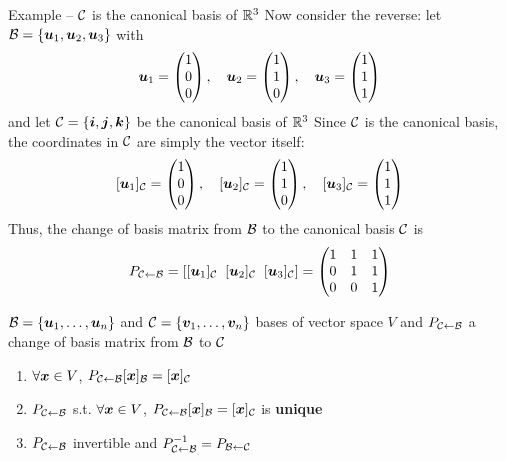 \documentclass[aspectratio=169]{beamer}\usepackage[]{graphicx}\usepackage[]{xcolor}
\begin{document}
\begin{frame}{Example -- $\mathcal{C}$ is the canonical basis of $\mathbb{R}^3$}
Now consider the reverse: let $\mathcal{B}=\{\bm{u}_1,\bm{u}_2,\bm{u}_3\}$ with
\[
\bm{u}_1 = \begin{pmatrix} 1 \\ 0 \\ 0 \end{pmatrix}, \quad
\bm{u}_2 = \begin{pmatrix} 1 \\ 1 \\ 0 \end{pmatrix}, \quad
\bm{u}_3 = \begin{pmatrix} 1 \\ 1 \\ 1 \end{pmatrix}
\]
and let $\mathcal{C}=\{\bm{i},\bm{j},\bm{k}\}$ be the canonical basis of $\mathbb{R}^3$
\vfill
Since $\mathcal{C}$ is the canonical basis, the coordinates in $\mathcal{C}$ are simply the vector itself:
\[
[\bm{u}_1]_{\mathcal{C}} = \begin{pmatrix} 1 \\ 0 \\ 0 \end{pmatrix}, \quad
[\bm{u}_2]_{\mathcal{C}} = \begin{pmatrix} 1 \\ 1 \\ 0 \end{pmatrix}, \quad
[\bm{u}_3]_{\mathcal{C}} = \begin{pmatrix} 1 \\ 1 \\ 1 \end{pmatrix}
\]
\vfill
Thus, the change of basis matrix from $\mathcal{B}$ to the canonical basis $\mathcal{C}$ is
\[
P_{\mathcal{C}\leftarrow\mathcal{B}} = [[\bm{u}_1]_{\mathcal{C}} \;\; [\bm{u}_2]_{\mathcal{C}} \;\; [\bm{u}_3]_{\mathcal{C}}] = \begin{pmatrix} 1 & 1 & 1 \\ 0 & 1 & 1 \\ 0 & 0 & 1 \end{pmatrix}
\]
\end{frame}

\begin{frame}
\begin{importanttheorem}\label{th:change-of-basis-properties}
$\mathcal{B}=\{\bm{u}_1,\ldots,\bm{u}_n\}$ and $\mathcal{C}=\{\bm{v}_1,\ldots,\bm{v}_n\}$ bases of vector space $V$ and $P_{\mathcal{C}\leftarrow\mathcal{B}}$ a change of basis matrix from $\mathcal{B}$ to $\mathcal{C}$
\begin{enumerate}
\item $\forall\bm{x}\in V$, $P_{\mathcal{C}\leftarrow\mathcal{B}}[\bm{x}]_{\mathcal{B}} = [\bm{x}]_{\mathcal{C}}$
\item $P_{\mathcal{C}\leftarrow\mathcal{B}}$ s.t. $\forall\bm{x}\in V$, $P_{\mathcal{C}\leftarrow\mathcal{B}}[\bm{x}]_{\mathcal{B}} = [\bm{x}]_{\mathcal{C}}$ is \textbf{unique}
\item $P_{\mathcal{C}\leftarrow\mathcal{B}}$ invertible and $P_{\mathcal{C}\leftarrow\mathcal{B}}^{-1}=P_{\mathcal{B}\leftarrow\mathcal{C}}$
\end{enumerate}
\end{importanttheorem}
\end{frame}
\end{document}
